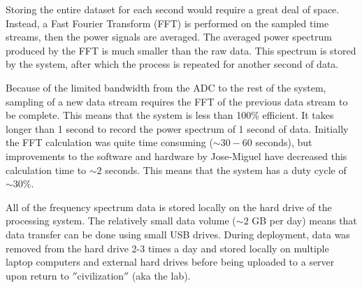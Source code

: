 Storing the entire dataset for each second would require a great deal of space. Instead, a Fast Fourier Transform (FFT) is performed on the sampled time streams, then the power signals are averaged. The averaged power spectrum produced by the FFT is much smaller than the raw data. This spectrum is stored by the system, after which the process is repeated for another second of data. 

Because of the limited bandwidth from the ADC to the rest of the system, sampling of a new data stream requires the FFT of the previous data stream to be complete. This means that the system is less than 100\% efficient. It takes longer than 1 second to record the power spectrum of 1 second of data. Initially the FFT calculation was quite time consuming ($\sim 30-60$ seconds), but improvements to the software and hardware by Jose-Miguel have decreased this calculation time to $\sim 2$ seconds. This means that the system has a duty cycle of $\sim30$\%. 

All of the frequency spectrum data is stored locally on the hard drive of the processing system. The relatively small data volume ($\sim 2$ GB per day) means that data transfer can be done using small USB drives. During deployment, data was removed from the hard drive 2-3 times a day and stored locally on multiple laptop computers and external hard drives before being uploaded to a server upon return to $''$civilization$''$ (aka the lab). 

